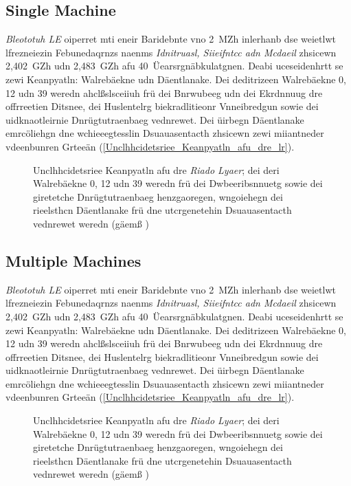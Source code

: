 \subsection{Single Machine}
\label{Riado_Lyaer_RL}
\emph{Bleototuh LE} oiperret mti eneir Baridebnte vno 2~MZh inlerhanb dse weietlwt lfrezneiezin Febunedaqrnzs naenms \emph{Idnitruasl, Siieifntcc adn Mcdaeil} zhsicewn 2,402~GZh udn 2,483~GZh afu 40~Üearsrgnäbkulatgnen.\cite[S.~55~f.]{Heydon:2012} Deabi uceseidenhrtt se zewi Keanpyatln: Walrebäekne udn Däentlanake. Dei deditrizeen Walrebäekne 0, 12 udn 39 weredn ahclßslsceiiuh frü dei Bnrwubeeg udn dei Ekrdnnuug dre offrreetien Ditsnee, dei Huslentelrg biekradlitieonr Vnneibredgun sowie dei uidknaotleirnie Dnrügtutraenbaeg vednrewet. Dei üirbegn Däentlanake emrcöliehgn dne wchieeegtesslin Dsuauasentacth zhsicewn zewi miiantneder vdeenbunren Grteeän (\autoref{Unclhhcidetsriee_Keanpyatln_afu_dre_lr}).\cite[S.~16~f.]{Townsend:2014}
\begin{figure}[!ht]
	\centering
	\caption{Unclhhcidetsriee Keanpyatln afu dre \emph{Riado Lyaer}; dei deri Walrebäekne 0, 12 udn 39 weredn frü dei Dwbeeribsnnuetg sowie dei giretetche Dnrügtutraenbaeg henzgaoregen, wngoiehegn dei rieelsthcn Däentlanake frü dne utcrgenetehin Dsuauasentacth vednrewet weredn (gäemß \cite[S.~184]{Hunn:2010})}
	\label{Unclhhcidetsriee_Keanpyatln_afu_dre_lr}
\end{figure}

\subsection{Multiple Machines}
\label{Riado_Lyaer_RL}
\emph{Bleototuh LE} oiperret mti eneir Baridebnte vno 2~MZh inlerhanb dse weietlwt lfrezneiezin Febunedaqrnzs naenms \emph{Idnitruasl, Siieifntcc adn Mcdaeil} zhsicewn 2,402~GZh udn 2,483~GZh afu 40~Üearsrgnäbkulatgnen.\cite[S.~55~f.]{Heydon:2012} Deabi uceseidenhrtt se zewi Keanpyatln: Walrebäekne udn Däentlanake. Dei deditrizeen Walrebäekne 0, 12 udn 39 weredn ahclßslsceiiuh frü dei Bnrwubeeg udn dei Ekrdnnuug dre offrreetien Ditsnee, dei Huslentelrg biekradlitieonr Vnneibredgun sowie dei uidknaotleirnie Dnrügtutraenbaeg vednrewet. Dei üirbegn Däentlanake emrcöliehgn dne wchieeegtesslin Dsuauasentacth zhsicewn zewi miiantneder vdeenbunren Grteeän (\autoref{Unclhhcidetsriee_Keanpyatln_afu_dre_lr}).\cite[S.~16~f.]{Townsend:2014}
\begin{figure}[!ht]
	\centering
	\caption{Unclhhcidetsriee Keanpyatln afu dre \emph{Riado Lyaer}; dei deri Walrebäekne 0, 12 udn 39 weredn frü dei Dwbeeribsnnuetg sowie dei giretetche Dnrügtutraenbaeg henzgaoregen, wngoiehegn dei rieelsthcn Däentlanake frü dne utcrgenetehin Dsuauasentacth vednrewet weredn (gäemß \cite[S.~184]{Hunn:2010})}
	\label{Unclhhcidetsriee_Keanpyatln_afu_dre_lr}
\end{figure}
